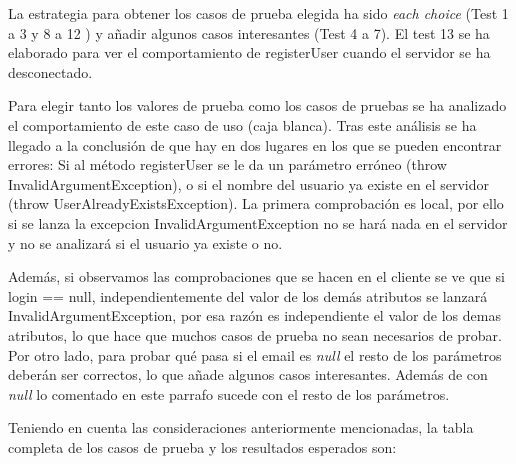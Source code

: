 La estrategia para obtener los casos de prueba elegida ha sido
\textit{each choice} (Test 1 a 3 y 8 a 12 ) y añadir algunos casos
interesantes (Test 4 a 7).
El test 13 se ha elaborado para ver el comportamiento de registerUser cuando el servidor se ha desconectado.

Para elegir tanto los valores de prueba como los casos de pruebas se ha analizado el comportamiento de este caso de uso (caja blanca). Tras este análisis se ha llegado a la conclusión de que hay en dos lugares en los que se pueden encontrar errores: Si al método registerUser se le da un parámetro erróneo (throw InvalidArgumentException), o si el nombre del usuario ya existe en el servidor (throw UserAlreadyExistsException). La primera comprobación es local, por ello si se lanza la excepcion InvalidArgumentException no se hará nada en el servidor y no se analizará si el usuario ya existe o no.

Además, si observamos las comprobaciones que se hacen en el cliente se ve que si login == null, independientemente del valor de los demás atributos se lanzará  InvalidArgumentException, por esa razón es independiente el valor de los demas atributos, lo que hace que muchos casos de prueba no sean necesarios de probar. Por otro lado, para probar qué pasa si el email es \textit{null} el resto de los parámetros deberán ser correctos, lo que añade algunos casos interesantes. Además de con \textit{null} lo comentado en este parrafo sucede con el resto de los parámetros.


Teniendo en cuenta las consideraciones anteriormente mencionadas, la tabla completa de los casos de prueba y los resultados esperados son:

